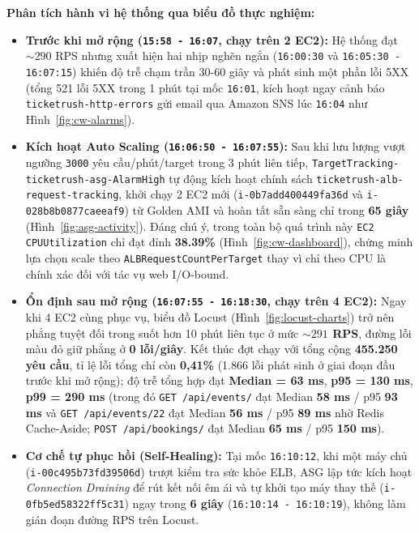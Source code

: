 \textbf{Phân tích hành vi hệ thống qua biểu đồ thực nghiệm:}
\begin{itemize}[leftmargin=1.5em]
  \item \textbf{Trước khi mở rộng (\texttt{15:58 - 16:07}, chạy trên 2 EC2):} Hệ thống đạt $\sim 290$ RPS nhưng xuất hiện hai nhịp nghẽn ngắn (\texttt{16:00:30} và \texttt{16:05:30 - 16:07:15}) khiến độ trễ chạm trần 30-60 giây và phát sinh một phần lỗi 5XX (tổng 521 lỗi 5XX trong 1 phút tại mốc \texttt{16:01}, kích hoạt ngay cảnh báo \texttt{ticketrush-http-errors} gửi email qua Amazon SNS lúc \texttt{16:04} như Hình~\ref{fig:cw-alarms}).
  \item \textbf{Kích hoạt Auto Scaling (\texttt{16:06:50 - 16:07:55}):} Sau khi lưu lượng vượt ngưỡng \texttt{3000} yêu cầu/phút/target trong 3 phút liên tiếp, \texttt{TargetTracking-ticketrush-asg-AlarmHigh} tự động kích hoạt chính sách \texttt{ticketrush-alb-request-tracking}, khởi chạy 2 EC2 mới (\texttt{i-0b7add400449fa36d} và \texttt{i-028b8b0877caeeaf9}) từ Golden AMI và hoàn tất sẵn sàng chỉ trong \textbf{65 giây} (Hình~\ref{fig:asg-activity}). Đáng chú ý, trong toàn bộ quá trình này \texttt{EC2 CPUUtilization} chỉ đạt đỉnh \textbf{38.39\%} (Hình~\ref{fig:cw-dashboard}), chứng minh lựa chọn scale theo \texttt{ALBRequestCountPerTarget} thay vì chỉ theo CPU là chính xác đối với tác vụ web I/O-bound.
  \item \textbf{Ổn định sau mở rộng (\texttt{16:07:55 - 16:18:30}, chạy trên 4 EC2):} Ngay khi 4 EC2 cùng phục vụ, biểu đồ Locust (Hình~\ref{fig:locust-charts}) trở nên phẳng tuyệt đối trong suốt hơn 10 phút liên tục ở mức \textbf{$\sim 291$ RPS}, đường lỗi màu đỏ giữ phẳng ở \textbf{0 lỗi/giây}. Kết thúc đợt chạy với tổng cộng \textbf{455.250 yêu cầu}, tỉ lệ lỗi tổng chỉ còn \textbf{0,41\%} (1.866 lỗi phát sinh ở giai đoạn đầu trước khi mở rộng); độ trễ tổng hợp đạt \textbf{Median = 63 ms}, \textbf{p95 = 130 ms}, \textbf{p99 = 290 ms} (trong đó \texttt{GET /api/events/} đạt Median \textbf{58 ms} / p95 \textbf{93 ms} và \texttt{GET /api/events/22} đạt Median \textbf{56 ms} / p95 \textbf{89 ms} nhờ Redis Cache-Aside; \texttt{POST /api/bookings/} đạt Median \textbf{65 ms} / p95 \textbf{150 ms}).
  \item \textbf{Cơ chế tự phục hồi (Self-Healing):} Tại mốc \texttt{16:10:12}, khi một máy chủ (\texttt{i-00c495b73fd39506d}) trượt kiểm tra sức khỏe ELB, ASG lập tức kích hoạt \textit{Connection Draining} để rút kết nối êm ái và tự khởi tạo máy thay thế (\texttt{i-0fb5ed58322ff5c31}) ngay trong \textbf{6 giây} (\texttt{16:10:14 - 16:10:19}), không làm gián đoạn đường RPS trên Locust.
\end{itemize}

